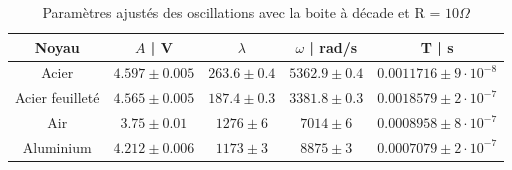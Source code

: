 \documentclass[preview]{standalone}
\begin{document}
 \setcounter{table}{4}
 \begin{table}[h!]
 \centering
 \label{tab:fits}
 \renewcommand{\arraystretch}{1.2}
 \begin{tabular}{|c|c|c|c|c|}
 \hline
 Noyau & $A$ | V & $\lambda$ & $\omega$ | rad/s & T | s \\
 \hline
 Acier     &
 $4.597 \pm 0.005$ &
 $263.6 \pm 0.4$ &
 $5362.9 \pm 0.4$ &
 $0.0011716 \pm 9 \cdot 10^{-8}$ \\

 Acier feuilleté     &
 $4.565 \pm 0.005$ &
 $187.4 \pm 0.3$ &
 $3381.8 \pm 0.3$ &
 $0.0018579 \pm 2 \cdot 10^{-7}$ \\

 Air     &
 $3.75 \pm 0.01$ &
 $1276 \pm 6$ &
 $7014 \pm 6$ &
 $0.0008958 \pm 8 \cdot 10^{-7}$ \\

 Aluminium    &
 $4.212 \pm 0.006$ &
 $1173 \pm 3$ &
 $8875 \pm 3$ &
 $0.0007079 \pm 2 \cdot 10^{-7}$ \\
 \hline
\end{tabular}
 \caption{Paramètres ajustés des oscillations avec la boite à décade et R = $10 \Omega$}
 \end{table}
\end{document}
